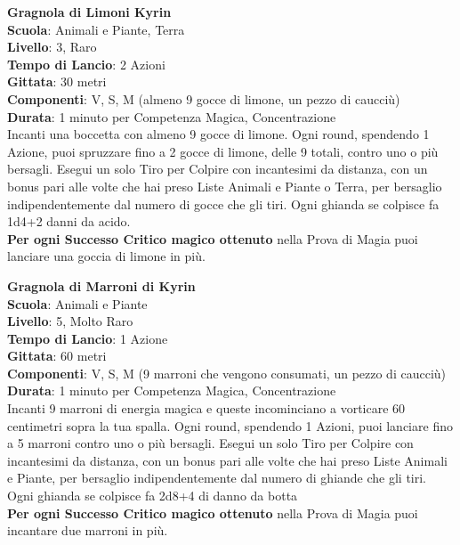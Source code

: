 \begin{multicols}{2}
\medskip\textbf{Gragnola di Limoni Kyrin}\\
\textbf{Scuola}: Animali e Piante, Terra\\
\textbf{Livello}: 3, Raro\\
\textbf{Tempo di Lancio}: 2 Azioni\\
\textbf{Gittata}: 30 metri\\
\textbf{Componenti}: V, S, M (almeno 9 gocce di limone, un pezzo di caucciù)\\
\textbf{Durata}: 1 minuto per Competenza Magica, Concentrazione\\
Incanti una boccetta con almeno 9 gocce di limone.
Ogni round, spendendo 1 Azione, puoi spruzzare fino a 2 gocce di limone, delle 9 totali, contro uno o più bersagli. Esegui un solo Tiro per Colpire con incantesimi da distanza, con un bonus pari alle volte che hai preso Liste Animali e Piante o Terra, per bersaglio indipendentemente dal numero di gocce che gli tiri. Ogni ghianda se colpisce fa 1d4+2 danni da acido.\\
\textbf{Per ogni Successo Critico magico ottenuto} nella Prova di Magia puoi lanciare una goccia di limone in più.

\medskip\textbf{Gragnola di Marroni di Kyrin}\\
\textbf{Scuola}: Animali e Piante\\
\textbf{Livello}: 5, Molto Raro\\
\textbf{Tempo di Lancio}: 1 Azione\\
\textbf{Gittata}: 60 metri\\
\textbf{Componenti}: V, S, M (9 marroni che vengono consumati, un pezzo di caucciù)\\
\textbf{Durata}: 1 minuto per Competenza Magica, Concentrazione\\
Incanti 9 marroni di energia magica e queste incominciano a vorticare 60 centimetri sopra la tua spalla.
Ogni round, spendendo 1 Azioni, puoi lanciare fino a 5 marroni contro uno o più bersagli. Esegui un solo Tiro per Colpire con incantesimi da distanza, con un bonus pari alle volte che hai preso Liste Animali e Piante, per bersaglio indipendentemente dal numero di ghiande che gli tiri. Ogni ghianda se colpisce fa 2d8+4 di danno da botta\\
\textbf{Per ogni Successo Critico magico ottenuto} nella Prova di Magia puoi incantare due marroni in più.


\end{multicols}
